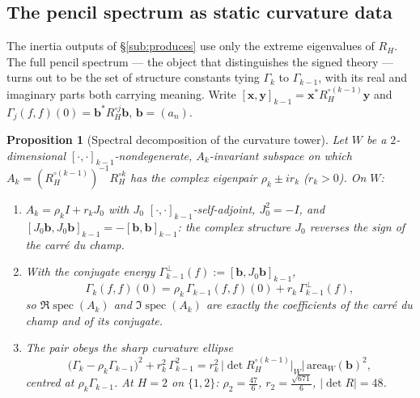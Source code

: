 \documentclass[11pt,reqno]{amsart}
\theoremstyle{plain}
\newtheorem{proposition}[theorem]{Proposition}
\theoremstyle{definition}
\newcommand{\Had}{\mathbin{\circ}}
\newcommand{\Gam}{\Gamma}
\DeclareMathOperator{\spec}{spec}
\begin{document}
\subsection{The pencil spectrum as static curvature data}\label{sub:pencil}
The inertia outputs of \S\ref{sub:produces} use only the extreme eigenvalues of
$R_H$. The full pencil spectrum --- the object that distinguishes the signed
theory --- turns out to be the set of structure constants tying $\Gam_k$ to
$\Gam_{k-1}$, with its real and imaginary parts both carrying meaning. Write
$[\mathbf x,\mathbf y]_{k-1}=\mathbf x^{*}R_H^{\Had(k-1)}\mathbf y$ and
$\Gam_j(f,f)(0)=\mathbf b^{*}R_H^{\Had j}\mathbf b$, $\mathbf b=(a_n)$.

\begin{proposition}[Spectral decomposition of the curvature tower]\label{prop:decomp}
Let $W$ be a $2$-dimensional $[\cdot,\cdot]_{k-1}$-nondegenerate, $A_k$-invariant
subspace on which $A_k=(R_H^{\Had(k-1)})^{-1}R_H^{\Had k}$ has the complex
eigenpair $\rho_k\pm i r_k$ \textup($r_k>0$\textup). On $W$:
\begin{enumerate}[label=\textup{(\roman*)},leftmargin=2.2em]
\item $A_k=\rho_k I+r_k J_0$ with $J_0$ \emph{$[\cdot,\cdot]_{k-1}$-self-adjoint},
$J_0^2=-I$, and $[J_0\mathbf b,J_0\mathbf b]_{k-1}=-[\mathbf b,\mathbf b]_{k-1}$:
the complex structure $J_0$ \emph{reverses the sign} of the carr\'e du champ.
\item With the conjugate energy
$\Gam^{\perp}_{k-1}(f):=[\mathbf b,J_0\mathbf b]_{k-1}$,
\begin{equation}\label{eq:decomp}
  \Gam_k(f,f)(0)=\rho_k\,\Gam_{k-1}(f,f)(0)+r_k\,\Gam^{\perp}_{k-1}(f),
\end{equation}
so $\Re\spec(A_k)$ and $\Im\spec(A_k)$ are exactly the coefficients of the
carr\'e du champ and of its conjugate.
\item The pair obeys the sharp curvature ellipse
\begin{equation}\label{eq:ellipse}
  \bigl(\Gam_k-\rho_k\Gam_{k-1}\bigr)^2+r_k^2\,\Gam_{k-1}^2
  = r_k^2\,\bigl|\det R_H^{\Had(k-1)}\big|_W\bigr|\,\mathrm{area}_W(\mathbf b)^2,
\end{equation}
centred at $\rho_k\Gam_{k-1}$. At $H=2$ on $\{1,2\}$:
$\rho_2=\tfrac{47}{6}$, $r_2=\tfrac{\sqrt{671}}{6}$, $|\det R|=48$.
\end{enumerate}
\end{proposition}
\end{document}
